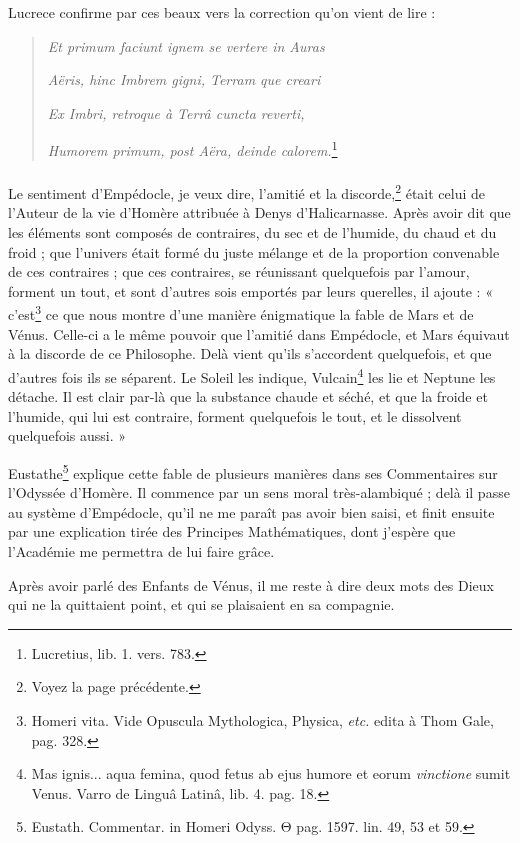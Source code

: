 \documentclass[a4paper, 18pt, oneside]{article}
\begin{document}
Lucrece confirme par ces beaux vers la correction qu'on vient de lire :
\begin{quotation}
\emph{Et primum faciunt ignem se vertere in Auras}

\emph{Aëris, hinc Imbrem gigni, Terram que creari}

\emph{Ex Imbri, retroque à Terrâ cuncta reverti,}

\emph{Humorem primum, post Aëra, deinde calorem.}\footnote{Lucretius, lib. 1. vers. 783.}
\end{quotation}
\paragraph{}
Le sentiment d'Empédocle, je veux dire, l'amitié et la discorde,\footnote{Voyez la page précédente.} était celui de l'Auteur de la vie d'Homère attribuée à Denys d'Halicarnasse. Après avoir dit que les éléments sont composés de contraires, du sec et de l'humide, du chaud et du froid ; que l'univers était formé du juste mélange et de la proportion convenable de ces contraires ; que ces contraires, se réunissant quelquefois par l'amour, forment un tout, et sont d'autres sois emportés par leurs querelles, il ajoute : « c'est\footnote{Homeri vita. Vide Opuscula Mythologica, Physica, \emph{etc.} edita à Thom Gale, pag. 328.} ce que nous montre d'une manière énigmatique la fable de Mars et de Vénus. Celle-ci a le même pouvoir que l'amitié dans Empédocle, et Mars équivaut à la discorde de ce Philosophe. Delà vient qu'ils s'accordent quelquefois, et que d'autres fois ils se séparent. Le Soleil les indique, Vulcain\footnote{Mas ignis... aqua femina, quod fetus ab ejus humore et eorum \emph{vinctione} sumit Venus. Varro de Linguâ Latinâ, lib. 4. pag. 18.} les lie et Neptune les détache. Il est clair par-là que la substance chaude et séché, et que la froide et l'humide, qui lui est contraire, forment quelquefois le tout, et le dissolvent quelquefois aussi. »

Eustathe\footnote{Eustath. Commentar. in Homeri Odyss. Θ pag. 1597. lin. 49, 53 et 59.} explique cette fable de plusieurs manières dans ses Commentaires sur l'Odyssée d'Homère. Il commence par un sens moral très-alambiqué ; delà il passe au système d'Empédocle, qu'il ne me paraît pas avoir bien saisi, et finit ensuite par une explication tirée des Principes Mathématiques, dont j'espère que l'Académie me permettra de lui faire grâce.

Après avoir parlé des Enfants de Vénus, il me reste à dire deux mots des Dieux qui ne la quittaient point, et qui se plaisaient en sa compagnie.
\end{document}
